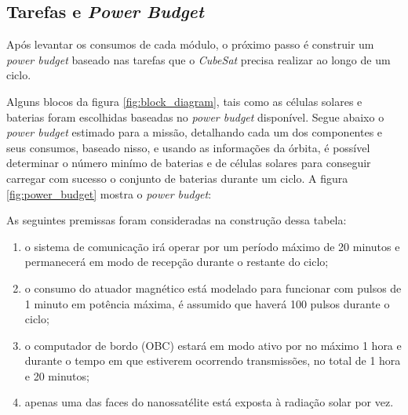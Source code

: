 \subsection*{Tarefas e \textit{Power Budget}}

Após levantar os consumos de cada módulo, o próximo passo é construir um \textit{power budget} baseado nas tarefas que o \textit{CubeSat} precisa realizar ao longo de um ciclo.  

Alguns blocos da figura \ref{fig:block_diagram}, tais como as células solares e baterias foram escolhidas baseadas no \textit{power budget} disponível. Segue abaixo o \textit{power budget} estimado para a missão, detalhando cada um dos componentes e seus consumos, baseado nisso, e usando as informações da órbita, é possível determinar o número minímo de baterias e de células solares para conseguir carregar com sucesso o conjunto de baterias durante um ciclo. A figura \ref{fig:power_budget} mostra o \textit{power budget}:

\noindent
\begin{minipage}{\linewidth}
\label{fig:power_budget}
\end{minipage}

As seguintes premissas foram consideradas na construção dessa tabela:

\begin{enumerate}
    \item o sistema de comunicação irá operar por um período máximo de 20 minutos e permanecerá em modo de recepção durante o restante do ciclo;
    \item o consumo do atuador magnético está modelado para funcionar com pulsos de 1 minuto em potência máxima, é assumido que haverá 100 pulsos durante o ciclo;
    \item o computador de bordo (OBC) estará em modo ativo por no máximo 1 hora e durante o tempo em que estiverem ocorrendo transmissões, no total de 1 hora e 20 minutos;
    \item apenas uma das faces do nanossatélite está exposta à radiação solar por vez.
\end{enumerate}


